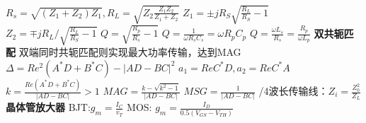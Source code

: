 \documentclass[10.5pt,landscape]{article}
\begin{document}
\begin{multicols*}{4}
$ R_s = \sqrt{(Z_1 + Z_2)Z_1}, R_L = \sqrt{Z_2 \frac{Z_1 Z_2}{Z_1 + Z_2}}$ \newline
$ Z_1 = \pm jR_S \sqrt{\frac{R_L}{R_S} - 1}$\newline
$ Z_2 = \mp jR_L / \sqrt{\frac{R_L}{R_S} - 1}$ \newline
$ Q = \sqrt{\frac{R_p}{R_s} - 1}$ \newline
$ Q = \frac{1}{\omega R_s C_s} = \omega R_pC_p$ \newline
$ Q = \frac{\omega L_s}{R_s} = \frac{R_p}{\omega L_p}$ \newline
\textbf{双共轭匹配} \newline
双端同时共轭匹配则实现最大功率传输，达到MAG \newline
$\Delta = Re^2(A^*D + B^*C)- | AD - BC |^2$ \newline
$a_1 = Re{C^*D}, a_2 = Re{C^*A}$ \newline
$k = \frac{Re(A^*D + B^*C)}{| AD - BC |} > 1$ \newline
$MAG = \frac{k - \sqrt{k^2 - 1}}{|AD - BC|}$ \newline
$MSG = \frac{1}{|AD - BC|}$ /4波长传输线：$Z_i = \frac{Z_0^2}{Z_L}$ \newline
\textbf{晶体管放大器}\newline
BJT:$g_m = \frac{I_C}{v_T}$  MOS: $g_m = \frac{I_D}{0.5(V_{GS}- V_{TH})}$ \newline


\end{multicols*}
\end{document}
